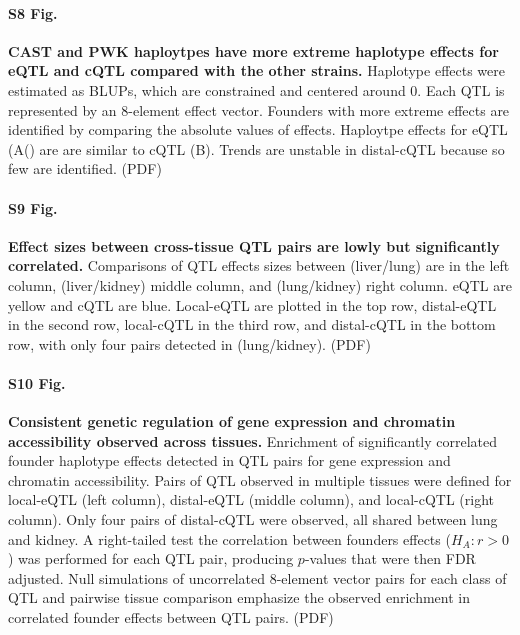 \documentclass[10pt,letterpaper]{article}
\begin{document}
\paragraph*{S8 Fig.}
\label{S_qtl_effects_abs}
{\bf CAST and PWK haploytpes have more extreme haplotype effects for eQTL and cQTL compared with the other strains.}
Haplotype effects were estimated as BLUPs, which are constrained and centered around 0. Each QTL is represented by an 8-element effect vector. Founders with more extreme effects are identified by comparing the absolute values of effects. Haploytpe effects for eQTL (A() are are similar to cQTL (B). Trends are unstable in distal-cQTL because so few are identified. (PDF)

\paragraph*{S9 Fig.}
\label{S_qtl_effect_size_comparison}
{\bf Effect sizes between cross-tissue QTL pairs are lowly but significantly correlated.}
Comparisons of QTL effects sizes between (liver/lung) are in the left column, (liver/kidney) middle column, and (lung/kidney) right column. eQTL are yellow and cQTL are blue. Local-eQTL are plotted in the top row, distal-eQTL in the second row, local-cQTL in the third row, and distal-cQTL in the bottom row, with only four pairs detected in (lung/kidney). (PDF)

\paragraph*{S10 Fig.}
\label{S_qtl_pair_histograms}
{\bf Consistent genetic regulation of gene expression and chromatin accessibility observed across tissues.}
Enrichment of significantly correlated founder haplotype effects detected in QTL pairs for gene expression and chromatin accessibility. Pairs of QTL observed in multiple tissues were defined for local-eQTL (left column), distal-eQTL (middle column), and local-cQTL (right column). Only four pairs of distal-cQTL were observed, all shared between lung and kidney. A right-tailed test the correlation between founders effects ($H_{A}: r > 0$) was performed for each QTL pair, producing $p$-values that were then FDR adjusted. Null simulations of uncorrelated 8-element vector pairs for each class of QTL and pairwise tissue comparison emphasize the observed enrichment in correlated founder effects between QTL pairs. (PDF)
\end{document}
